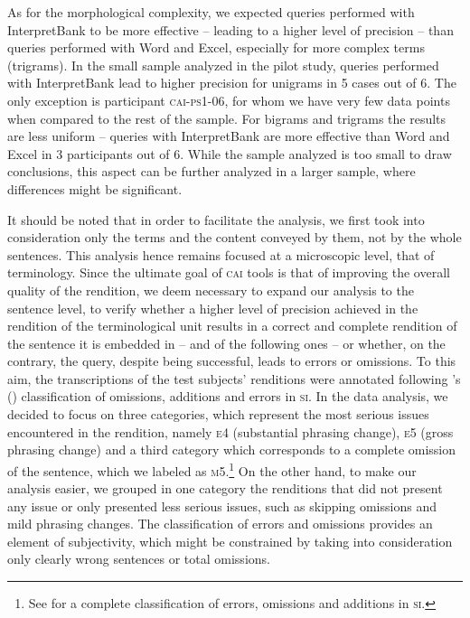 \documentclass[output=paper]{langsci/langscibook}
\begin{document}
As for the morphological complexity, we expected queries performed with InterpretBank to be more effective – leading to a higher level of precision – than queries performed with Word and Excel, especially for more complex terms (trigrams). In the small sample analyzed in the pilot study, queries performed with InterpretBank lead to higher precision for unigrams in 5 cases out of 6. The only exception is participant \textsc{cai}-\textsc{ps1-06}, for whom we have very few data points when compared to the rest of the sample. For bigrams and trigrams the results are less uniform -- queries with InterpretBank are more effective than Word and Excel in 3 participants out of 6. While the sample analyzed is too small to draw conclusions, this aspect can be further analyzed in a larger sample, where differences might be significant.

It should be noted that in order to facilitate the analysis, we first took into consideration only the terms and the content conveyed by them, not by the whole sentences. This analysis hence remains focused at a microscopic level, that of terminology. Since the ultimate goal of \textsc{cai} tools is that of improving the overall quality of the rendition, we deem necessary to expand our analysis to the sentence level, to verify whether a higher level of precision achieved in the rendition of the terminological unit results in a correct and complete rendition of the sentence it is embedded in – and of the following ones – or whether, on the contrary, the query, despite being successful, leads to errors or omissions. To this aim, the transcriptions of the test subjects’ renditions were annotated following \citeauthor{Barik1971}’s (\citeyear{Barik1971}) classification of omissions, additions and errors in \textsc{si}. In the data analysis, we decided to focus on three categories, which represent the most serious issues encountered in the rendition, namely \textsc{e4} (substantial phrasing change), \textsc{e5} (gross phrasing change) and a third category which corresponds to a complete omission of the sentence, which we labeled as \textsc{m5}.\footnote{See \citet{Barik1971} for a complete classification of errors, omissions and additions in \textsc{si}.} On the other hand, to make our analysis easier, we grouped in one category the renditions that did not present any issue or only presented less serious issues, such as skipping omissions and mild phrasing changes. The classification of errors and omissions provides an element of subjectivity, which might be constrained by taking into consideration only clearly wrong sentences or total omissions.
\end{document}
